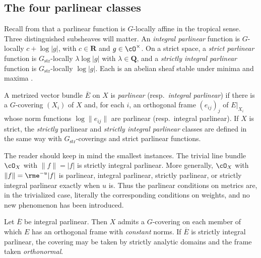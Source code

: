 \subsection{The four parlinear classes}
\label{sec:ch17-four-classes}

Recall from  that a parlinear function is
$G$-locally affine in the tropical sense.  Three distinguished subsheaves
will matter.  An \emph{integral parlinear} function is $G$-locally
$c+\log|g|$, with $c\in\mathbf R$ and $g\in\cO^\times$.  On a strict
space, a \emph{strict parlinear} function is $G_{\mathrm{str}}$-locally
$\lambda\log|g|$ with $\lambda\in\mathbf Q$, and a \emph{strictly
integral parlinear} function is $G_{\mathrm{str}}$-locally $\log|g|$.
Each is an abelian sheaf stable under minima and maxima
\cite[\S12.5.2 and Lemma~12.5.3]{CLD25}.

\begin{definition}
\label{def:ch17-parlinear-metric}
A metrized vector bundle $\overline E$ on $X$ is \emph{parlinear}
(resp.\ \emph{integral parlinear}) if there is a $G$-covering $(X_i)$ of
$X$ and, for each $i$, an orthogonal frame $(e_{ij})_j$ of
$E|_{X_i}$ whose norm functions $\log\|e_{ij}\|$ are parlinear (resp.\
integral parlinear).  If $X$ is strict, the \emph{strictly} parlinear and
\emph{strictly integral parlinear} classes are defined in the same way with
$G_{\mathrm{str}}$-coverings and strict parlinear functions.
\end{definition}

The reader should keep in mind the smallest instances.  The trivial line
bundle $\cO_X$ with $\|f\|=|f|$ is strictly integral parlinear.  More
generally, $\cO_X$ with $\|f\|=\rme^{-u}|f|$ is parlinear, integral
parlinear, strictly parlinear, or strictly integral parlinear exactly when
$u$ is.  Thus the parlinear conditions on metrics are, in the trivialized
case, literally the corresponding conditions on weights, and no new
phenomenon has been introduced.

\begin{lemma}
\label{lem:ch17-orthonormal-refine}
Let $\overline E$ be integral parlinear.  Then $X$ admits a
$G$-covering on each member of which $E$ has an orthogonal frame with
\emph{constant} norms.  If $\overline E$ is strictly integral parlinear,
the covering may be taken by strictly analytic domains and the frame taken
\emph{orthonormal}.
\end{lemma}

